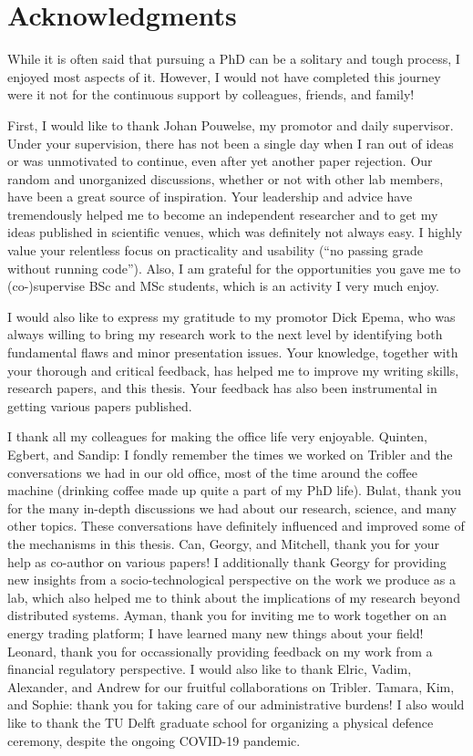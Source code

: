 \chapter*{Acknowledgments}

While it is often said that pursuing a PhD can be a solitary and tough process, I enjoyed most aspects of it.
However, I would not have completed this journey were it not for the continuous support by colleagues, friends, and family!

First, I would like to thank Johan Pouwelse, my promotor and daily supervisor.
Under your supervision, there has not been a single day when I ran out of ideas or was unmotivated to continue, even after yet another paper rejection.
Our random and unorganized discussions, whether or not with other lab members, have been a great source of inspiration.
Your leadership and advice have tremendously helped me to become an independent researcher and to get my ideas published in scientific venues, which was definitely not always easy.
I highly value your relentless focus on practicality and usability (\enquote{no passing grade without running code}).
Also, I am grateful for the opportunities you gave me to (co-)supervise BSc and MSc students, which is an activity I very much enjoy.

I would also like to express my gratitude to my promotor Dick Epema, who was always willing to bring my research work to the next level by identifying both fundamental flaws and minor presentation issues.
Your knowledge, together with your thorough and critical feedback, has helped me to improve my writing skills, research papers, and this thesis.
Your feedback has also been instrumental in getting various papers published.

I thank all my colleagues for making the office life very enjoyable.
Quinten, Egbert, and Sandip: I fondly remember the times we worked on Tribler and the conversations we had in our old office, most of the time around the coffee machine (drinking coffee made up quite a part of my PhD life\emojicoffee{}).
Bulat, thank you for the many in-depth discussions we had about our research, science, and many other topics.
These conversations have definitely influenced and improved some of the mechanisms in this thesis.
Can, Georgy, and Mitchell, thank you for your help as co-author on various papers!
I additionally thank Georgy for providing new insights from a socio-technological perspective on the work we produce as a lab, which also helped me to think about the implications of my research beyond distributed systems.
Ayman, thank you for inviting me to work together on an energy trading platform; I have learned many new things about your field!
Leonard, thank you for occassionally providing feedback on my work from a financial regulatory perspective.
I would also like to thank Elric, Vadim, Alexander, and Andrew for our fruitful collaborations on Tribler.
Tamara, Kim, and Sophie: thank you for taking care of our administrative burdens!
I also would like to thank the TU Delft graduate school for organizing a physical defence ceremony, despite the ongoing COVID-19 pandemic.

